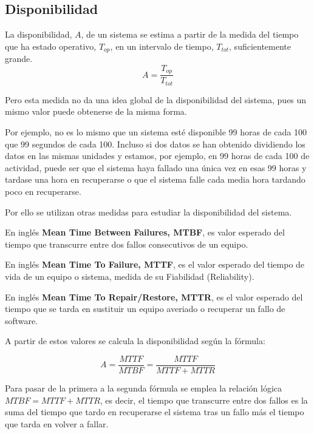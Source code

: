 \documentclass{apuntes}[nochap]
\begin{document}
\subsection{Disponibilidad}
La disponibilidad, $A$, de un sistema se estima a partir de la medida del tiempo que ha estado operativo, $T_{op}$, en un intervalo de tiempo, $T_{tot}$, suficientemente grande.
\[A= \frac{T_{op}}{T_{tot}}\]

Pero esta medida no da una idea global de la disponibilidad del sistema, pues un mismo valor puede obtenerse de la misma forma.

Por ejemplo, no es lo mismo que un sistema esté disponible 99 horas de cada 100 que 99 segundos de cada 100. Incluso si dos datos se han obtenido dividiendo los datos en las mismas unidades y estamos, por ejemplo, en 99 horas de cada 100 de actividad, puede ser que el sistema haya fallado una única vez en esas 99 horas y tardase una hora en recuperarse o que el sistema falle cada media hora tardando poco en recuperarse.

Por ello se utilizan otras medidas para estudiar la disponibilidad del sistema.

\begin{defn}

En inglés \textbf{Mean Time Between Failures, MTBF}, es valor esperado del tiempo que transcurre entre dos fallos consecutivos de un equipo.
\end{defn}

\begin{defn}

En inglés \textbf{Mean Time To Failure, MTTF}, es el valor esperado del tiempo de vida de un equipo o sistema, medida de su Fiabilidad (Reliability).
\end{defn}

\begin{defn}

En inglés \textbf{Mean Time To Repair/Restore, MTTR}, es el valor esperado del tiempo que se tarda en sustituir un equipo averiado o recuperar un fallo de software.
\end{defn}

A partir de estos valores se calcula la disponibilidad según la fórmula:

\[A=\frac{MTTF}{MTBF}=\frac{MTTF}{MTTF+MTTR}\]

Para pasar de la primera a la segunda fórmula se emplea la relación lógica $MTBF=MTTF+MTTR$, es decir, el tiempo que transcurre entre dos fallos es la suma del tiempo que tardo en recuperarse el sistema tras un fallo más el tiempo que tarda en volver a fallar.
\end{document}
